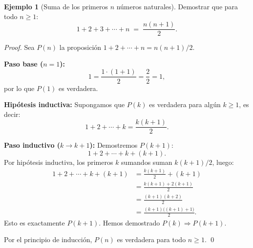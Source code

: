 \documentclass[11pt,a4paper]{article}
\theoremstyle{definition}
\theoremstyle{plain}
\theoremstyle{definition}
\newtheorem{ejemplo}{Ejemplo}[section]
\theoremstyle{definition}
\theoremstyle{remark}
\newcommand{\implica}{\Rightarrow}         %
\begin{document}
\begin{ejemplo}[Suma de los primeros $n$ n\'umeros naturales]
\label{ej:suma1an}
Demostrar que para todo $n \geq 1$:
\[
1 + 2 + 3 + \cdots + n \;=\; \frac{n(n+1)}{2}.
\]

\begin{proof}
Sea $P(n)$ la proposici\'on $1+2+\cdots+n = n(n+1)/2$.

\noindent\textbf{Paso base ($n=1$):}
\[
1 = \frac{1\cdot(1+1)}{2} = \frac{2}{2} = 1,
\]
por lo que $P(1)$ es verdadera.

\noindent\textbf{Hip\'otesis inductiva:} Supongamos que $P(k)$ es verdadera para alg\'un
$k \geq 1$, es decir:
\[
1 + 2 + \cdots + k = \frac{k(k+1)}{2}.
\]

\noindent\textbf{Paso inductivo ($k \to k+1$):} Demostremos $P(k+1)$:
\[
1 + 2 + \cdots + k + (k+1).
\]
Por hip\'otesis inductiva, los primeros $k$ sumandos suman $k(k+1)/2$, luego:
\[
\begin{aligned}
1 + 2 + \cdots + k + (k+1)
&= \frac{k(k+1)}{2} + (k+1) \\
&= \frac{k(k+1) + 2(k+1)}{2} \\
&= \frac{(k+1)(k+2)}{2} \\
&= \frac{(k+1)\bigl((k+1)+1\bigr)}{2}.
\end{aligned}
\]
Esto es exactamente $P(k+1)$. Hemos demostrado $P(k) \implica P(k+1)$.

\noindent Por el principio de inducci\'on, $P(n)$ es verdadera para todo $n\geq 1$.
\qed
\end{proof}
\end{ejemplo}
\end{document}
